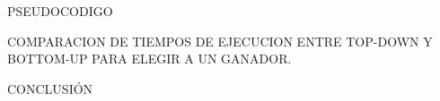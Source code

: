 PSEUDOCODIGO
\newline

COMPARACION DE TIEMPOS DE EJECUCION ENTRE TOP-DOWN Y BOTTOM-UP PARA ELEGIR A UN GANADOR.
\newline

CONCLUSI\'ON

